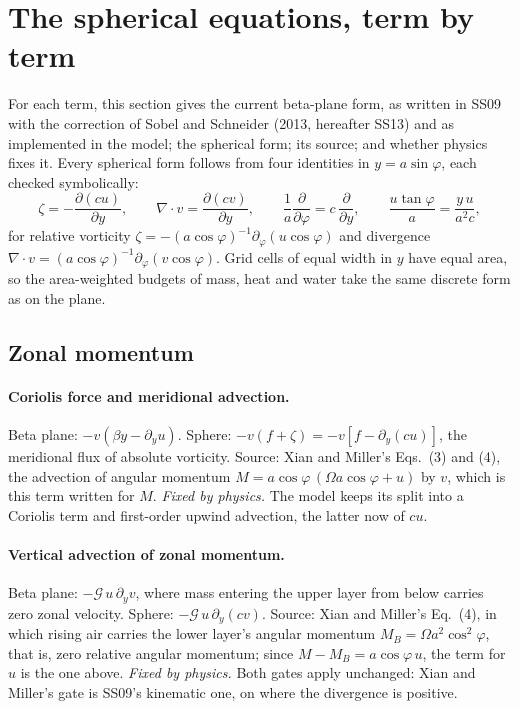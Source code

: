 \documentclass[11pt]{article}
\newcommand{\pd}[2]{\frac{\partial #1}{\partial #2}}
\begin{document}
\section{The spherical equations, term by term}
\label{sec:terms}

For each term, this section gives the current beta-plane form, as written in
SS09 with the correction of Sobel and Schneider (2013, hereafter SS13) and as
implemented in the model; the spherical form; its source; and whether physics
fixes it. Every spherical form follows from four identities in
$y = a\sin\varphi$, each checked symbolically:
\begin{equation}
  \zeta = -\pd{(cu)}{y},\qquad
  \nabla\cdot v = \pd{(cv)}{y},\qquad
  \frac{1}{a}\pd{}{\varphi} = c\,\pd{}{y},\qquad
  \frac{u\tan\varphi}{a} = \frac{y\,u}{a^2 c},
  \label{eq:identities}
\end{equation}
for relative vorticity $\zeta = -(a\cos\varphi)^{-1}\partial_\varphi(u\cos\varphi)$
and divergence $\nabla\cdot v = (a\cos\varphi)^{-1}\partial_\varphi(v\cos\varphi)$.
Grid cells of equal width in $y$ have equal area, so the area-weighted budgets
of mass, heat and water take the same discrete form as on the plane.

\subsection{Zonal momentum}

\paragraph{Coriolis force and meridional advection.} Beta plane:
$-v(\beta y - \partial_y u)$. Sphere: $-v(f + \zeta) = -v[f - \partial_y(cu)]$,
the meridional flux of absolute vorticity. Source: Xian and Miller's
Eqs.~(3) and (4), the advection of angular momentum $M = a\cos\varphi\,(\Omega a\cos\varphi + u)$
by $v$, which is this term written for $M$. \emph{Fixed by physics.} The model
keeps its split into a Coriolis term and first-order upwind advection, the
latter now of $cu$.

\paragraph{Vertical advection of zonal momentum.} Beta plane:
$-\mathcal{G}\,u\,\partial_y v$, where mass entering the upper layer from below
carries zero zonal velocity. Sphere: $-\mathcal{G}\,u\,\partial_y(cv)$. Source:
Xian and Miller's Eq.~(4), in which rising air carries the lower layer's angular
momentum $M_B = \Omega a^2\cos^2\varphi$, that is, zero relative angular
momentum; since $M - M_B = a\cos\varphi\,u$, the term for $u$ is the one above.
\emph{Fixed by physics.} Both gates apply unchanged: Xian and Miller's gate is
SS09's kinematic one, on where the divergence is positive.
\end{document}
